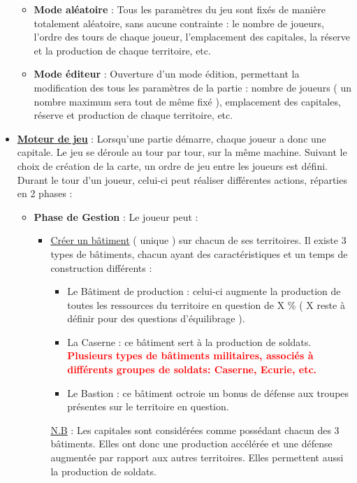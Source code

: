 \begin{itemize}
\begin{itemize}
	\item \textbf{Mode aléatoire} : Tous les paramètres du jeu sont fixés de manière totalement aléatoire, sans aucune contrainte : le nombre de joueurs, l'ordre des tours de chaque joueur, l'emplacement des capitales, la réserve et la production de chaque territoire, etc.
	\item \textbf{Mode éditeur} : Ouverture d'un mode édition, permettant la modification des tous les paramètres de la partie : nombre de joueurs ( un nombre maximum sera tout de même fixé ), emplacement des capitales, réserve et production de chaque territoire, etc.
      \end{itemize}
    \vspace{1cm}
    \item \textbf{\underline{Moteur de jeu}} : Lorsqu'une partie démarre, chaque joueur a donc une capitale. Le jeu se déroule au tour par tour, sur la même machine. Suivant le choix de création de la carte, un ordre de jeu entre les joueurs est défini. Durant le tour d'un joueur, celui-ci peut réaliser différentes actions, réparties en 2 phases :
      \begin{itemize}
	\vspace{0.5cm}
	\item \textbf{Phase de Gestion} : Le joueur peut : 
	  \begin{itemize} 
	    \item \underline{Créer un bâtiment} ( unique ) sur chacun de ses territoires. Il existe 3 types de bâtiments, chacun ayant des caractéristiques et un temps de construction différents : 
	      \begin{itemize}
		\item Le Bâtiment de production : celui-ci augmente la production de toutes les ressources du territoire en question de X \% ( X reste à définir pour des questions d'équilibrage ).
		\item La Caserne : ce bâtiment sert à la production de soldats.
		\textcolor{red}{\textbf{Plusieurs types de bâtiments militaires, associés à différents groupes de soldats: Caserne, Ecurie, etc.}}
		\item Le Bastion : ce bâtiment octroie un bonus de défense aux troupes présentes sur le territoire en question.
	      \end{itemize}
	    \underline{N.B} : Les capitales sont considérées comme possédant chacun des 3 bâtiments. Elles ont donc une production accélérée et une défense augmentée par 
	      rapport aux autres territoires. Elles permettent aussi la production de soldats.

\end{itemize}
\end{itemize}
\end{itemize}
